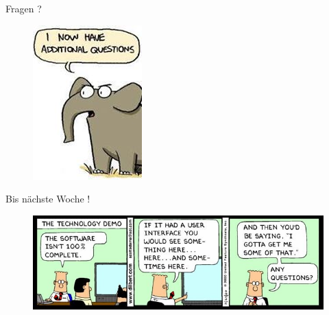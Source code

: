 \documentclass[18pt]{beamer}
\begin{document}
\begin{frame}{Fragen ?}
    \begin{figure}
        \includegraphics[scale=.6]{img/additionalquestions.jpg}
    \end{figure}
\end{frame}

\begin{frame}{Bis nächste Woche !}
    \begin{figure}
        \includegraphics[scale=.6]{img/dilbert-software-demo.jpg}
    \end{figure}
\end{frame}

\backupend
\end{document}
